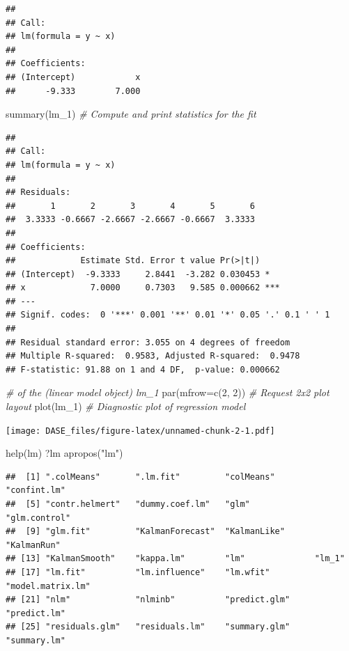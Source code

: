 \documentclass[
]{book}
\newenvironment{Shaded}{\begin{snugshade}}{\end{snugshade}}
\newcommand{\AttributeTok}[1]{\textcolor[rgb]{0.77,0.63,0.00}{#1}}
\newcommand{\CommentTok}[1]{\textcolor[rgb]{0.56,0.35,0.01}{\textit{#1}}}
\newcommand{\DecValTok}[1]{\textcolor[rgb]{0.00,0.00,0.81}{#1}}
\newcommand{\FunctionTok}[1]{\textcolor[rgb]{0.00,0.00,0.00}{#1}}
\newcommand{\NormalTok}[1]{#1}
\newcommand{\StringTok}[1]{\textcolor[rgb]{0.31,0.60,0.02}{#1}}
\begin{document}
\begin{verbatim}
## 
## Call:
## lm(formula = y ~ x)
## 
## Coefficients:
## (Intercept)            x  
##      -9.333        7.000
\end{verbatim}

\begin{Shaded}
\begin{Highlighting}[]
\FunctionTok{summary}\NormalTok{(lm\_1)         }\CommentTok{\# Compute and print statistics for the fit}
\end{Highlighting}
\end{Shaded}

\begin{verbatim}
## 
## Call:
## lm(formula = y ~ x)
## 
## Residuals:
##       1       2       3       4       5       6 
##  3.3333 -0.6667 -2.6667 -2.6667 -0.6667  3.3333 
## 
## Coefficients:
##             Estimate Std. Error t value Pr(>|t|)    
## (Intercept)  -9.3333     2.8441  -3.282 0.030453 *  
## x             7.0000     0.7303   9.585 0.000662 ***
## ---
## Signif. codes:  0 '***' 0.001 '**' 0.01 '*' 0.05 '.' 0.1 ' ' 1
## 
## Residual standard error: 3.055 on 4 degrees of freedom
## Multiple R-squared:  0.9583, Adjusted R-squared:  0.9478 
## F-statistic: 91.88 on 1 and 4 DF,  p-value: 0.000662
\end{verbatim}

\begin{Shaded}
\begin{Highlighting}[]
                      \CommentTok{\# of the (linear model object) lm\_1}
\FunctionTok{par}\NormalTok{(}\AttributeTok{mfrow=}\FunctionTok{c}\NormalTok{(}\DecValTok{2}\NormalTok{, }\DecValTok{2}\NormalTok{))    }\CommentTok{\# Request 2x2 plot layout}
\FunctionTok{plot}\NormalTok{(lm\_1)            }\CommentTok{\# Diagnostic plot of regression model}
\end{Highlighting}
\end{Shaded}

\texttt{[image: DASE\_files/figure-latex/unnamed-chunk-2-1.pdf]}

\begin{Shaded}
\begin{Highlighting}[]
\FunctionTok{help}\NormalTok{(lm)}
\NormalTok{?lm}
\FunctionTok{apropos}\NormalTok{(}\StringTok{"lm"}\NormalTok{)}
\end{Highlighting}
\end{Shaded}

\begin{verbatim}
##  [1] ".colMeans"       ".lm.fit"         "colMeans"        "confint.lm"     
##  [5] "contr.helmert"   "dummy.coef.lm"   "glm"             "glm.control"    
##  [9] "glm.fit"         "KalmanForecast"  "KalmanLike"      "KalmanRun"      
## [13] "KalmanSmooth"    "kappa.lm"        "lm"              "lm_1"           
## [17] "lm.fit"          "lm.influence"    "lm.wfit"         "model.matrix.lm"
## [21] "nlm"             "nlminb"          "predict.glm"     "predict.lm"     
## [25] "residuals.glm"   "residuals.lm"    "summary.glm"     "summary.lm"
\end{verbatim}
\end{document}
